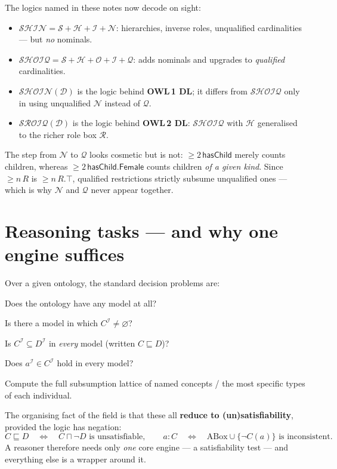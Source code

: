 \documentclass[11pt]{article}
\newcommand{\I}{\mathcal{I}}                 %
\newcommand{\interp}[1]{#1^{\I}}             %
\newcommand{\concept}[1]{\ensuremath{\mathsf{#1}}}%
\newcommand{\role}[1]{\ensuremath{\mathsf{#1}}}   %
\newcommand{\dl}[1]{\ensuremath{\mathcal{#1}}}%
\newcommand{\sub}{\sqsubseteq}
\newcommand{\inter}{\sqcap}
\newcommand{\topc}{\top}
\theoremstyle{definition}
\begin{document}
The logics named in these notes now decode on sight:
\begin{itemize}[nosep]
  \item $\dl{SHIN} = \dl{S} + \dl{H} + \dl{I} + \dl{N}$: hierarchies, inverse
        roles, unqualified cardinalities --- but \emph{no} nominals.
  \item $\dl{SHOIQ} = \dl{S} + \dl{H} + \dl{O} + \dl{I} + \dl{Q}$: adds
        nominals and upgrades to \emph{qualified} cardinalities.
  \item $\dl{SHOIN}(\dl{D})$ is the logic behind \textbf{OWL\,1 DL}; it differs
        from $\dl{SHOIQ}$ only in using unqualified $\dl{N}$ instead of $\dl{Q}$.
  \item $\dl{SROIQ}(\dl{D})$ is the logic behind \textbf{OWL\,2 DL}: $\dl{SHOIQ}$
        with $\dl{H}$ generalised to the richer role box $\dl{R}$.
\end{itemize}

The step from $\dl{N}$ to $\dl{Q}$ looks cosmetic but is not: $\geq 2\,
\role{hasChild}$ merely counts children, whereas $\geq 2\,
\role{hasChild}.\concept{Female}$ counts children \emph{of a given kind}. Since
$\geq n\,R$ is $\geq n\,R.\topc$, qualified restrictions strictly subsume
unqualified ones --- which is why $\dl{N}$ and $\dl{Q}$ never appear together.

\section{Reasoning tasks --- and why one engine suffices}

Over a given ontology, the standard decision problems are:
\begin{description}[nosep,style=nextline]
  \item[Consistency] Does the ontology have any model at all?
  \item[Concept satisfiability] Is there a model in which $\interp{C} \neq
        \varnothing$?
  \item[Subsumption] Is $\interp{C} \subseteq \interp{D}$ in \emph{every}
        model (written $C \sub D$)?
  \item[Instance checking] Does $\interp{a} \in \interp{C}$ hold in every model?
  \item[Classification / realization] Compute the full subsumption lattice of
        named concepts / the most specific types of each individual.
\end{description}

The organising fact of the field is that these all \textbf{reduce to
(un)satisfiability}, provided the logic has negation:
\[
  C \sub D \quad\Longleftrightarrow\quad C \inter \lnot D \text{ is unsatisfiable},
  \qquad
  a : C \quad\Longleftrightarrow\quad \text{ABox} \cup \{\lnot C(a)\} \text{ is inconsistent}.
\]
A reasoner therefore needs only \emph{one} core engine --- a satisfiability
test --- and everything else is a wrapper around it.
\end{document}
